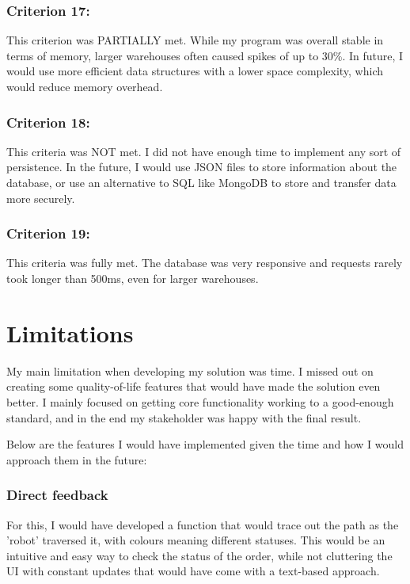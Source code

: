 \subsubsection{Criterion 17:}

This criterion was PARTIALLY met. While my program was overall stable in terms of memory, larger warehouses often caused spikes of up to 30\%. In future, I would use more efficient data structures with a lower space complexity, which would reduce memory overhead.

\subsubsection{Criterion 18:}

This criteria was NOT met. I did not have enough time to implement any sort of persistence. In the future, I would use JSON files to store information about the database, or use an alternative to SQL like MongoDB to store and transfer data more securely.

\subsubsection{Criterion 19:}

This criteria was fully met. The database was very responsive and requests rarely took longer than 500ms, even for larger warehouses.

\section{Limitations}

My main limitation when developing my solution was time. I missed out on creating some quality-of-life features that would have made the solution even better. I mainly focused on getting core functionality working to a good-enough standard, and in the end my stakeholder was happy with the final result.

Below are the features I would have implemented given the time and how I would approach them in the future:

\subsubsection{Direct feedback}

For this, I would have developed a function that would trace out the path as the 'robot' traversed it, with colours meaning different statuses. This would be an intuitive and easy way to check the status of the order, while not cluttering the UI with constant updates that would have come with a text-based approach. 

